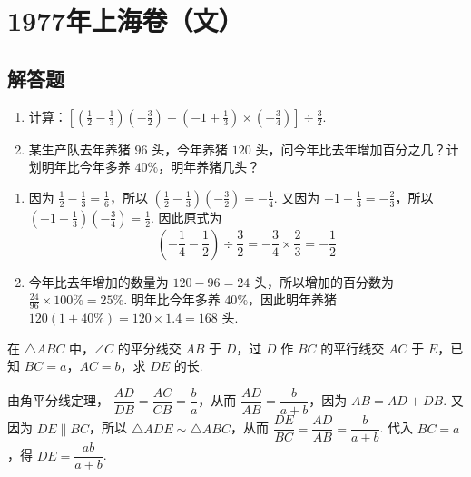 \chapter{1977年上海卷（文）}

\section{解答题}

\begin{problem}
\begin{enumerate}
\item
计算：\(\left[\left(\frac{1}{2}-\frac{1}{3}\right)\left(-\frac{3}{2}\right)-\left(-1+\frac{1}{3}\right)\times\left(-\frac{3}{4}\right)\right]\div\frac{3}{2}\).
\item 某生产队去年养猪 \(96\text{ 头}\)，今年养猪 \(120\text{ 头}\)，问今年比去年增加百分之几？计划明年比今年多养 \(40\%\)，明年养猪几头？
\end{enumerate}
\end{problem}

\begin{solution}
\begin{enumerate}
\item 因为 \(\frac{1}{2}-\frac{1}{3}=\frac{1}{6}\)，所以 \(\left(\frac{1}{2}-\frac{1}{3}\right)\left(-\frac{3}{2}\right)=-\frac{1}{4}\). 又因为 \(-1+\frac{1}{3}=-\frac{2}{3}\)，所以 \(\left(-1+\frac{1}{3}\right)\left(-\frac{3}{4}\right)=\frac{1}{2}\). 因此原式为
\[
\left(-\frac{1}{4}-\frac{1}{2}\right)\div\frac{3}{2}=-\frac{3}{4}\times\frac{2}{3}=-\frac{1}{2}
\]

\item 今年比去年增加的数量为 \(120-96=24\text{ 头}\)，所以增加的百分数为
\(\frac{24}{96}\times100\%=25\%\).
明年比今年多养 \(40\%\)，因此明年养猪
\(120\left(1+40\%\right)=120\times1.4=168\text{ 头}\).
\end{enumerate}
\end{solution}

\begin{problem}
在 \(\triangle ABC\) 中，\(\angle C\) 的平分线交 \(AB\) 于 \(D\)，过 \(D\) 作 \(BC\) 的平行线交 \(AC\) 于 \(E\)，已知 \(BC=a\)，\(AC=b\)，求 \(DE\) 的长.

\end{problem}

\begin{solution}
由角平分线定理，
\(\dfrac{AD}{DB}=\dfrac{AC}{CB}=\dfrac{b}{a}\)，从而
\(\dfrac{AD}{AB}=\dfrac{b}{a+b}\)，因为 \(AB=AD+DB\).
又因为 \(DE\parallel BC\)，所以 \(\triangle ADE\sim\triangle ABC\)，从而
\(\dfrac{DE}{BC}=\dfrac{AD}{AB}=\dfrac{b}{a+b}\).
代入 \(BC=a\)，得 \(DE=\dfrac{ab}{a+b}\).
\end{solution}

